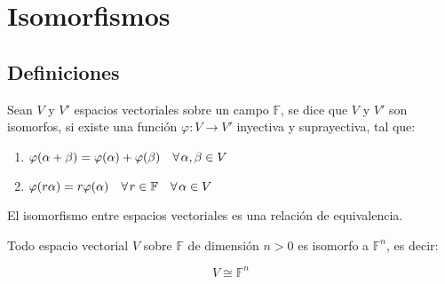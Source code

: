 \newpage
\section{Isomorfismos}

	\subsection{Definiciones}

		\begin{definicion}
			Sean $V$ y $V'$ espacios vectoriales sobre un campo $\mathbb{F}$, se dice que $V$ y $V'$ son isomorfos, si existe una función $\varphi \colon V \to V'$ inyectiva y suprayectiva, tal que:

			\begin{enumerate}
				\item $\varphi(\alpha + \beta) = \varphi(\alpha) + \varphi(\beta) \quad \forall \mkern2mu \alpha, \beta \in V$
				\item $\varphi(r \alpha) = r \varphi(\alpha) \quad \forall \mkern2mu r \in \mathbb{F} \quad \forall \mkern2mu \alpha \in V$
			\end{enumerate}
		\end{definicion}

		\begin{proposicion}
			El isomorfismo entre espacios vectoriales es una relación de equivalencia.
		\end{proposicion}

		\begin{teorema}
			Todo espacio vectorial $V$ sobre $\mathbb{F}$ de dimensión $n > 0 $ es isomorfo a $\mathbb{F}^n$, es decir:

			\begin{equation}
				V \cong \mathbb{F}^n
			\end{equation}
		\end{teorema}

